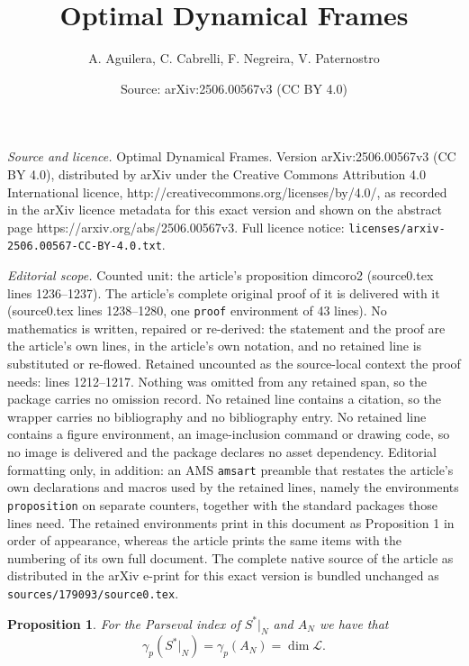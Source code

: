 \documentclass[10pt,a4paper]{amsart}
\title{Optimal Dynamical Frames}
\author{A. Aguilera, C. Cabrelli, F. Negreira, V. Paternostro}
\date{Source: arXiv:2506.00567v3 (CC BY 4.0)}
\newtheorem{proposition}{Proposition}
\begin{document}
\maketitle

\noindent\emph{Source and licence.} Optimal Dynamical Frames. Version arXiv:2506.00567v3 (CC BY 4.0), distributed by arXiv under the Creative Commons Attribution 4.0 International licence, http://creativecommons.org/licenses/by/4.0/, as recorded in the arXiv licence metadata for this exact version and shown on the abstract page https://arxiv.org/abs/2506.00567v3. Full licence notice: \texttt{licenses/arxiv-2506.00567-CC-BY-4.0.txt}.\par\smallskip

\noindent\textit{Editorial scope.} Counted unit: the article's proposition dimcoro2 (source0.tex lines 1236--1237). The article's complete original proof of it is delivered with it (source0.tex lines 1238--1280, one \texttt{proof} environment of 43 lines). No mathematics is written, repaired or re-derived: the statement and the proof are the article's own lines, in the article's own notation, and no retained line is substituted or re-flowed.  Retained uncounted as the source-local context the proof needs: lines 1212--1217.  Nothing was omitted from any retained span, so the package carries no omission record.  No retained line contains a citation, so the wrapper carries no bibliography and no bibliography entry.  No retained line contains a figure environment, an image-inclusion command or drawing code, so no image is delivered and the package declares no asset dependency.  Editorial formatting only, in addition: an AMS \texttt{amsart} preamble that restates the article's own declarations and macros used by the retained lines, namely the environments \texttt{proposition} on separate counters, together with the standard packages those lines need.  The retained environments print in this document as Proposition 1 in order of appearance, whereas the article prints the same items with the numbering of its own full document.  The complete native source of the article as distributed in the arXiv e-print for this exact version is bundled unchanged as \texttt{sources/179093/source0.tex}.
\begin{proposition}\label{dimcoro}
For the Parseval index of $S^*|_N$ and $A_N$ we have that
\begin{equation*}
\gamma_p(S^*|_N)=\gamma_p(A_N)=\dim\mathcal{L}.
\end{equation*}
\end{proposition}
\end{document}

